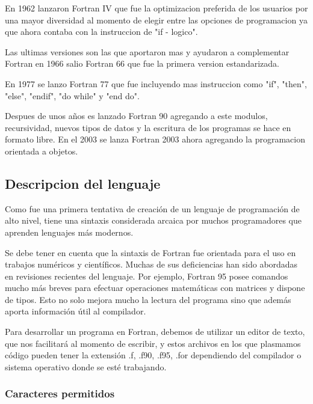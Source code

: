 \vspace{0.2in}

En 1962 lanzaron Fortran IV que fue la optimizacion preferida de los usuarios por una mayor diversidad al momento de elegir entre las opciones de programacion ya que ahora contaba con la instruccion de "if - logico".

\vspace{0.2in}

Las ultimas versiones son las que aportaron mas y ayudaron a complementar Fortran en 1966 salio Fortran 66 que fue la primera version estandarizada.

\vspace{0.2in}

En 1977 se lanzo Fortran 77 que fue incluyendo mas instruccion como "if", "then", "else", "endif", "do while" y "end do".

Despues de unos años es lanzado Fortran 90 agregando a este modulos, recursividad, nuevos tipos de datos y la escritura de los programas se hace en formato libre. En el 2003 se lanza Fortran 2003 ahora agregando la programacion orientada a objetos.

\subsection{Descripcion del lenguaje}

Como fue una primera tentativa de creación de un lenguaje de programación de alto nivel, tiene una sintaxis considerada arcaica por muchos programadores que aprenden lenguajes más modernos.

Se debe tener en cuenta que la sintaxis de Fortran fue orientada para el uso en trabajos numéricos y científicos. Muchas de sus deficiencias han sido abordadas en revisiones recientes del lenguaje. Por ejemplo, Fortran 95 posee comandos mucho más breves para efectuar operaciones matemáticas con matrices y dispone de tipos. Esto no solo mejora mucho la lectura del programa sino que además aporta información útil al compilador.

Para desarrollar un programa en Fortran, debemos de utilizar un editor de texto, que nos facilitará al momento de escribir, y estos archivos en los que plasmamos código pueden tener la extensión  .f, .f90, .f95, .for dependiendo del compilador o sistema operativo donde se esté trabajando.

\subsubsection{Caracteres permitidos}

